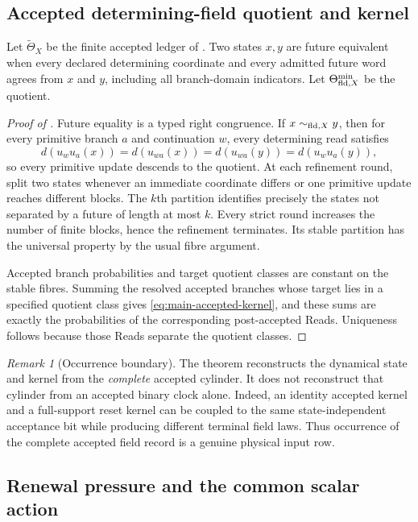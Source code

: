 \documentclass[11pt]{article}
\numberwithin{equation}{section}
\theoremstyle{definition}
\theoremstyle{remark}
\newtheorem{remark}[remark]{Remark}
\begin{document}
\subsection{Accepted determining-field quotient and kernel}

Let $\widetilde\Theta_X$ be the finite accepted ledger of
.  Two states $x,y$ are future equivalent when
every declared determining coordinate and every admitted future word agrees
from $x$ and $y$, including all branch-domain indicators.  Let
$\Theta_{{\rm fld},X}^{\min}$ be the quotient.


\begin{proof}[Proof of ]
Future equality is a typed right congruence.  If $x\sim_{{\rm fld},X}y$, then
for every primitive branch $a$ and continuation $w$, every determining read
satisfies
\[
 d(u_wu_a(x))=d(u_{wa}(x))=d(u_{wa}(y))=d(u_wu_a(y)),
\]
so every primitive update descends to the quotient.  At each refinement round,
split two states whenever an immediate coordinate differs or one primitive
update reaches different blocks.  The $k$th partition identifies precisely the
states not separated by a future of length at most $k$.  Every strict round
increases the number of finite blocks, hence the refinement terminates.  Its
stable partition has the universal property by the usual fibre argument.

Accepted branch probabilities and target quotient classes are constant on the
stable fibres.  Summing the resolved accepted branches whose target lies in a
specified quotient class gives \eqref{eq:main-accepted-kernel}, and these sums
are exactly the probabilities of the corresponding post-accepted Reads.
Uniqueness follows because those Reads separate the quotient classes.
\end{proof}

\begin{remark}[Occurrence boundary]
The theorem reconstructs the dynamical state and kernel from the \emph{complete}
accepted cylinder.  It does not reconstruct that cylinder from an accepted
binary clock alone.  Indeed, an identity accepted kernel and a full-support
reset kernel can be coupled to the same state-independent acceptance bit while
producing different terminal field laws.  Thus occurrence of the complete
accepted field record is a genuine physical input row.
\end{remark}

\subsection{Renewal pressure and the common scalar action}
\end{document}
